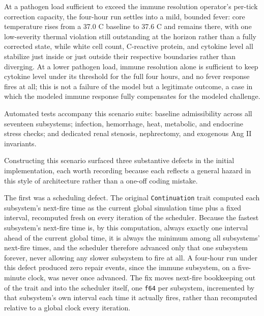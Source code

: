 \documentclass[11pt]{article}
\begin{document}
At a pathogen load sufficient to exceed the immune resolution operator's per-tick correction capacity, the four-hour run settles into a mild, bounded fever: core temperature rises from a 37.0 \textdegree C baseline to 37.6 \textdegree C and remains there, with one low-severity thermal violation still outstanding at the horizon rather than a fully corrected state, while white cell count, C-reactive protein, and cytokine level all stabilize just inside or just outside their respective boundaries rather than diverging. At a lower pathogen load, immune resolution alone is sufficient to keep cytokine level under its threshold for the full four hours, and no fever response fires at all; this is not a failure of the model but a legitimate outcome, a case in which the modeled immune response fully compensates for the modeled challenge.

Automated tests accompany this scenario suite: baseline admissibility across all seventeen subsystems; infection, hemorrhage, heat, metabolic, and endocrine stress checks; and dedicated renal stenosis, nephrectomy, and exogenous Ang II invariants.

Constructing this scenario surfaced three substantive defects in the initial implementation, each worth recording because each reflects a general hazard in this style of architecture rather than a one-off coding mistake.

The first was a scheduling defect. The original \texttt{Continuation} trait computed each subsystem's next-fire time as the current global simulation time plus a fixed interval, recomputed fresh on every iteration of the scheduler. Because the fastest subsystem's next-fire time is, by this computation, always exactly one interval ahead of the current global time, it is always the minimum among all subsystems' next-fire times, and the scheduler therefore advanced only that one subsystem forever, never allowing any slower subsystem to fire at all. A four-hour run under this defect produced zero repair events, since the immune subsystem, on a five-minute clock, was never once advanced. The fix moves next-fire bookkeeping out of the trait and into the scheduler itself, one \texttt{f64} per subsystem, incremented by that subsystem's own interval each time it actually fires, rather than recomputed relative to a global clock every iteration.
\end{document}
